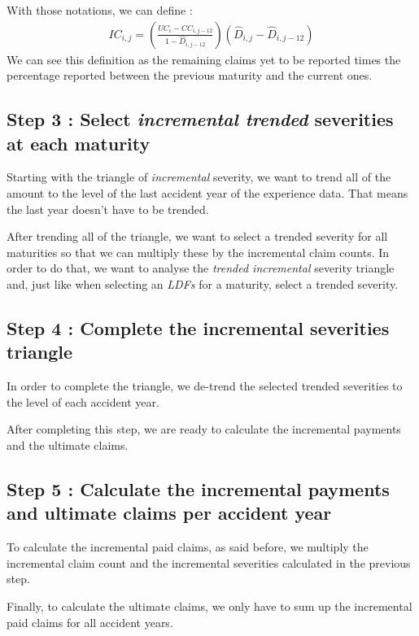 \documentclass[11pt, english]{memoir}
\numberwithin{definition}{section}
\begin{document}
With those notations, we can define :
\begin{align*}
IC_{i,j} = \left(\frac{UC_{i} - CC_{i,j-12}}{1- \hat{D}_{i,j-12}}\right)(\hat{D}_{i, j} - \hat{D}_{i,j-12}) 
\end{align*}
We can see this definition as the remaining claims yet to be reported times the percentage reported between the previous maturity and the current ones. 



\subsection*{Step 3 : Select \emph{incremental trended} severities at each maturity}
Starting with the triangle of \emph{incremental} severity, we want to trend all of the amount to the level of the last accident year of the experience data. That means the last year doesn't have to be trended. 

After trending all of the triangle, we want to select a trended severity for all maturities so that we can multiply these by the incremental claim counts. In order to do that, we want to analyse the \emph{trended incremental} severity triangle and, just like when selecting an \emph{LDFs} for a maturity, select a trended severity. 



\subsection*{Step 4 : Complete the incremental severities triangle}
In order to complete the triangle, we de-trend the selected trended severities to the level of each accident year. 

After completing this step, we are ready to calculate the incremental payments and the ultimate claims. 



\subsection*{Step 5 : Calculate the incremental payments and ultimate claims per accident year}
To calculate the incremental paid claims, as said before, we multiply the incremental claim count and the incremental severities calculated in the previous step. 

Finally, to calculate the ultimate claims, we only have to sum up the incremental paid claims for all accident years. 
\end{document}
